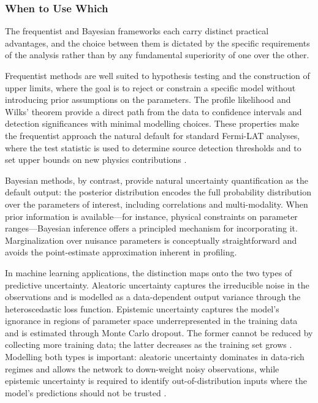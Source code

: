 
\subsubsection{When to Use Which}
\label{sec:3.1.4}

The frequentist and Bayesian frameworks each carry distinct practical advantages, and the choice between them is dictated by the specific requirements of the analysis rather than by any fundamental superiority of one over the other.

Frequentist methods are well suited to hypothesis testing and the construction of upper limits, where the goal is to reject or constrain a specific model without introducing prior assumptions on the parameters. The profile likelihood and Wilks' theorem provide a direct path from the data to confidence intervals and detection significances with minimal modelling choices. These properties make the frequentist approach the natural default for standard Fermi-LAT analyses, where the test statistic is used to determine source detection thresholds and to set upper bounds on new physics contributions \cite{Amerio:2025sub, Amerio:2024msp}.

Bayesian methods, by contrast, provide natural uncertainty quantification as the default output: the posterior distribution encodes the full probability distribution over the parameters of interest, including correlations and multi-modality. When prior information is available---for instance, physical constraints on parameter ranges---Bayesian inference offers a principled mechanism for incorporating it. Marginalization over nuisance parameters is conceptually straightforward and avoids the point-estimate approximation inherent in profiling.

In machine learning applications, the distinction maps onto the two types of predictive uncertainty. Aleatoric uncertainty captures the irreducible noise in the observations and is modelled as a data-dependent output variance through the heteroscedastic loss function. Epistemic uncertainty captures the model's ignorance in regions of parameter space underrepresented in the training data and is estimated through Monte Carlo dropout. The former cannot be reduced by collecting more training data; the latter decreases as the training set grows \cite{Kendall:2017, Hullermeier:2021}. Modelling both types is important: aleatoric uncertainty dominates in data-rich regimes and allows the network to down-weight noisy observations, while epistemic uncertainty is required to identify out-of-distribution inputs where the model's predictions should not be trusted \cite{Kendall:2017}.

